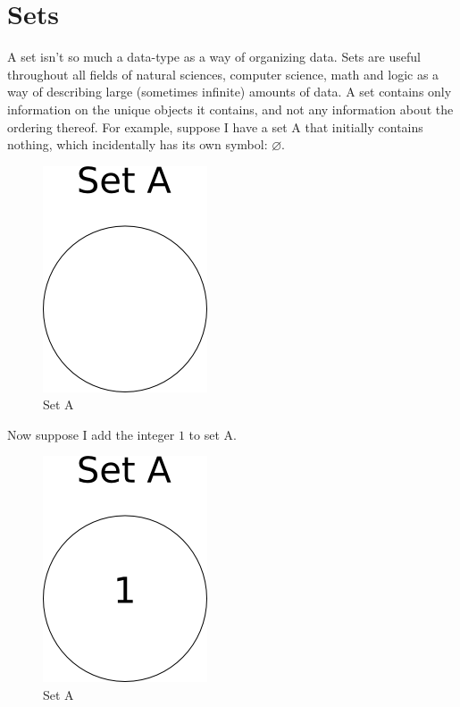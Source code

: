 \section{Sets}
A set isn't so much a data-type as a way of organizing data. Sets are useful throughout all fields of natural sciences, computer science, math and logic as a way of describing large (sometimes infinite) amounts of data. A set contains only information on the unique objects it contains, and not any information about the ordering thereof. For example, suppose I have a set A that initially contains nothing, which incidentally has its own symbol: $\varnothing$.
\begin{center}
\begin{figure}[h]
\caption{Set A} \label{fig:setAEmpty}
\includegraphics[scale=0.5]{figures/setAEmpty.png}
\end{figure}
\end{center}

Now suppose I add the integer $1$ to set A.
\begin{center}
\begin{figure}[h]
\caption{Set A} \label{fig:setA1}
\includegraphics[scale=0.5]{figures/setA1.png}
\end{figure}
\end{center}

